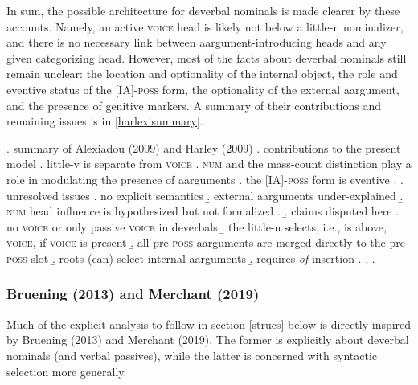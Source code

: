\documentclass[12pt]{article}
\begin{document}
In sum, the possible architecture for deverbal nominals is made clearer by these accounts. Namely, an active \textsc{voice} head is likely not below a little-n nominalizer, and there is no necessary link between aargument-introducing heads and any given categorizing head. However, most of the facts about deverbal nominals still remain unclear: the location and optionality of the internal object, the role and eventive status of the [IA]-\textsc{poss} form, the optionality of the external aargument, and the presence of genitive markers. A summary of their contributions and remaining issues is in \ref{harlexisummary}.

\singlespacing

\ex. \label{harlexisummary} summary of Alexiadou (2009) and Harley (2009)
\a. contributions to the present model
\a. little-v is separate from \textsc{voice}
\b. \textsc{num} and the mass-count distinction play a role in modulating the presence of aarguments
\b. the [IA]-\textsc{poss} form is eventive
\z. 
\b. unresolved issues
\a. no explicit semantics
\b. external aarguments under-explained
\b. \textsc{num} head influence is hypothesized but not formalized
\z. 
\b. claims disputed here
\a. no \textsc{voice} or only passive \textsc{voice} in deverbals
\b. the little-n selects, i.e., is above, \textsc{voice}, if \textsc{voice} is present
\b. all pre-\textsc{poss} aarguments are merged directly to the pre-\textsc{poss} slot
\b. roots (can) select internal aarguments
\b. requires \textit{of}-insertion
\z. \z. \z. \par \par

\doublespacing

\subsubsection{Bruening (2013) and Merchant (2019)}\label{priors3.3}

Much of the explicit analysis to follow in section \ref{strucs} below is directly inspired by Bruening (2013) and Merchant (2019). The former is explicitly about deverbal nominals (and verbal passives), while the latter is concerned with syntactic selection more generally.
\end{document}
